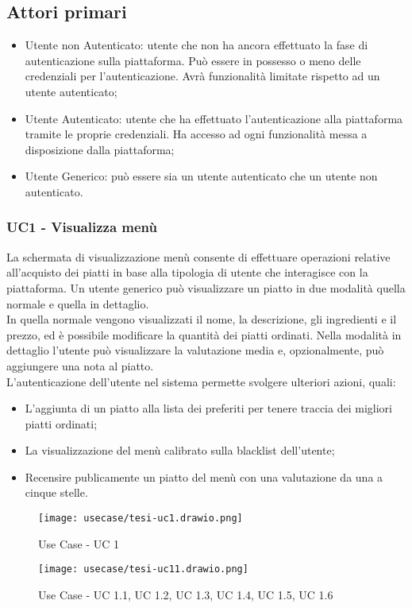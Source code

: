 \subsection{Attori primari}
\begin{itemize}
    \item Utente non Autenticato: utente che non ha ancora effettuato la fase di autenticazione sulla piattaforma. Può essere in possesso o meno delle credenziali per l'autenticazione. Avrà funzionalità limitate rispetto ad un utente autenticato;
    \item Utente Autenticato: utente che ha effettuato l'autenticazione alla piattaforma tramite le proprie credenziali. Ha accesso ad ogni funzionalità messa a disposizione dalla piattaforma;
    \item  Utente Generico: può essere sia un utente autenticato che un utente non autenticato.
\end{itemize}
\subsubsection{UC1 - Visualizza menù}
La schermata di visualizzazione menù consente di effettuare operazioni relative all'acquisto dei piatti in base alla tipologia di utente che interagisce con la piattaforma.
Un utente generico può visualizzare un piatto in due modalità quella normale e quella in dettaglio.\\
In quella normale vengono visualizzati il nome, la descrizione, gli ingredienti e il prezzo, ed è possibile modificare la quantità dei piatti ordinati.
Nella modalità in dettaglio l'utente può visualizzare la valutazione media e, opzionalmente, può aggiungere una nota al piatto.\\
L'autenticazione dell'utente nel sistema permette svolgere ulteriori azioni, quali:\\
\begin{itemize}
    \item L'aggiunta di un piatto alla lista dei preferiti per tenere traccia dei migliori piatti ordinati;
    \item La visualizzazione del menù calibrato sulla blacklist dell'utente;
    \item Recensire publicamente un piatto del menù con una valutazione da una a cinque stelle.
\end{itemize}
\begin{figure}[H]
    \centering
    \texttt{[image: usecase/tesi-uc1.drawio.png]}
    \caption{Use Case - UC 1}
\end{figure}
\begin{figure}[H]
    \centering
    \texttt{[image: usecase/tesi-uc11.drawio.png]}
    \caption{Use Case - UC 1.1, UC 1.2, UC 1.3, UC 1.4, UC 1.5, UC 1.6}
\end{figure}
